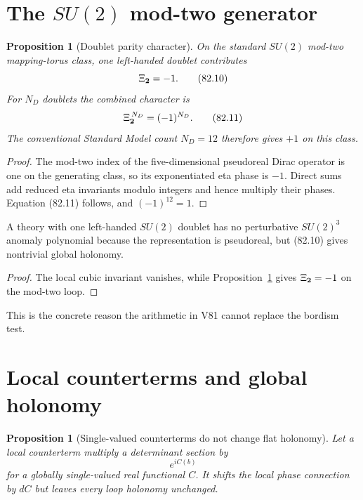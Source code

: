 \documentclass[11pt]{article}
\newtheorem{proposition}[theorem]{Proposition}
\theoremstyle{remark}
\begin{document}
\section{The \(SU(2)\) mod-two generator}

\begin{proposition}[Doublet parity character]
\label{prop:v15v82-su2}
On the standard \(SU(2)\) mod-two mapping-torus class, one
left-handed doublet contributes
\[
 \Xi_{\bf2}=-1.                                       \tag{82.10}
\]
For \(N_D\) doublets the combined character is
\[
 \Xi_{\bf2}^{\,N_D}=(-1)^{N_D}.                       \tag{82.11}
\]
The conventional Standard Model count \(N_D=12\) therefore gives
\(+1\) on this class.
\end{proposition}

\begin{proof}
The mod-two index of the five-dimensional pseudoreal Dirac
operator is one on the generating class, so its exponentiated eta
phase is \(-1\).  Direct sums add reduced eta invariants modulo
integers and hence multiply their phases.  Equation (82.11)
follows, and \((-1)^{12}=1\).
\end{proof}

\begin{counterexample}
\label{cnt:v15v82-witten}
A theory with one left-handed \(SU(2)\) doublet has no perturbative
\(SU(2)^3\) anomaly polynomial because the representation is
pseudoreal, but (82.10) gives nontrivial global holonomy.
\end{counterexample}

\begin{proof}
The local cubic invariant vanishes, while
Proposition~\ref{prop:v15v82-su2} gives \(\Xi_{\bf2}=-1\) on the
mod-two loop.
\end{proof}

This is the concrete reason the arithmetic in V81 cannot replace
the bordism test.

\section{Local counterterms and global holonomy}

\begin{proposition}[Single-valued counterterms do not change flat holonomy]
\label{prop:v15v82-counterterm}
Let a local counterterm multiply a determinant section by
\[
 e^{iC(b)}
\]
for a globally single-valued real functional \(C\).  It shifts the
local phase connection by \(dC\) but leaves every loop holonomy
unchanged.
\end{proposition}
\end{document}
